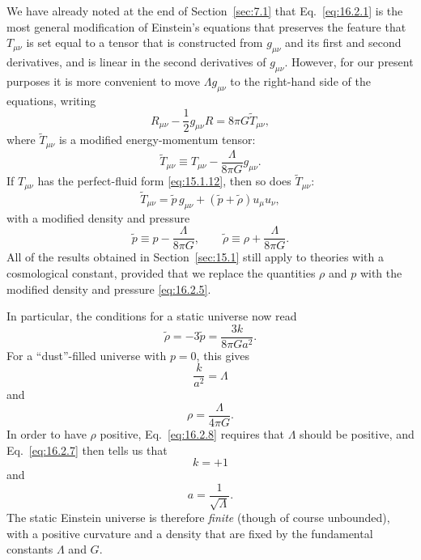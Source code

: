 We have already noted at the end of Section~\ref{sec:7.1} that
Eq.~\eqref{eq:16.2.1} is the most general modification of Einstein's equations
that preserves the feature that \(T_{\mu\nu}\) is set equal to a tensor that is
constructed from \(g_{\mu\nu}\) and its first and second derivatives, and is
linear in the second derivatives of \(g_{\mu\nu}\). However, for our present
purposes it is more convenient to move \(\Lambda g_{\mu\nu}\) to the
right-hand side of the equations, writing
\begin{equation}
  R_{\mu\nu}
  -\frac12g_{\mu\nu}R
  =
  8\pi G\widetilde T_{\mu\nu},
  \tag{16.2.2}\label{eq:16.2.2}
\end{equation}
where \(\widetilde T_{\mu\nu}\) is a modified energy-momentum tensor:
\begin{equation}
  \widetilde T_{\mu\nu}
  \equiv
  T_{\mu\nu}
  -\frac{\Lambda}{8\pi G}g_{\mu\nu}.
  \tag{16.2.3}\label{eq:16.2.3}
\end{equation}
If \(T_{\mu\nu}\) has the perfect-fluid form \eqref{eq:15.1.12}, then so does
\(\widetilde T_{\mu\nu}\):
\begin{equation}
  \widetilde T_{\mu\nu}
  =
  \widetilde p\,g_{\mu\nu}
  +(\widetilde p+\widetilde\rho)u_\mu u_\nu,
  \tag{16.2.4}\label{eq:16.2.4}
\end{equation}
with a modified density and pressure
\begin{equation}
  \widetilde p
  \equiv
  p-\frac{\Lambda}{8\pi G},
  \qquad
  \widetilde\rho
  \equiv
  \rho+\frac{\Lambda}{8\pi G}.
  \tag{16.2.5}\label{eq:16.2.5}
\end{equation}
All of the results obtained in Section~\ref{sec:15.1} still apply to theories
with a cosmological constant, provided that we replace the quantities \(\rho\)
and \(p\) with the modified density and pressure \eqref{eq:16.2.5}.

In particular, the conditions for a static universe now read
\begin{equation}
  \widetilde\rho
  =
  -3\widetilde p
  =
  \frac{3k}{8\pi G a^2}.
  \tag{16.2.6}\label{eq:16.2.6}
\end{equation}
For a ``dust''-filled universe with \(p=0\), this gives
\begin{equation}
  \frac{k}{a^2}=\Lambda
  \tag{16.2.7}\label{eq:16.2.7}
\end{equation}
and
\begin{equation}
  \rho=\frac{\Lambda}{4\pi G}.
  \tag{16.2.8}\label{eq:16.2.8}
\end{equation}
In order to have \(\rho\) positive, Eq.~\eqref{eq:16.2.8} requires that
\(\Lambda\) should be positive, and Eq.~\eqref{eq:16.2.7} then tells us that
\begin{equation}
  k=+1
  \tag{16.2.9}\label{eq:16.2.9}
\end{equation}
and
\begin{equation}
  a=\frac{1}{\sqrt{\Lambda}}.
  \tag{16.2.10}\label{eq:16.2.10}
\end{equation}
The static Einstein universe is therefore \emph{finite} (though of course
unbounded), with a positive curvature and a density that are fixed by the
fundamental constants \(\Lambda\) and \(G\).


